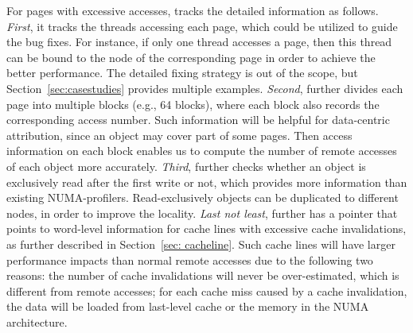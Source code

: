 For pages with excessive accesses, \NP{} tracks the detailed information as follows. \textit{First}, it tracks the threads accessing each page, which could be utilized to guide the bug fixes. For instance, if only one thread accesses a page, then this thread can be bound to the node of the corresponding page in order to achieve the better performance. The detailed fixing strategy is out of the scope, but Section~\ref{sec:casestudies} provides multiple examples. \textit{Second}, \NP{} further divides each page into multiple blocks (e.g., 64 blocks), where each block also records the corresponding access number. Such information will be helpful for data-centric attribution, since an object may cover part of some pages. Then access information on each block enables us to compute the number of remote accesses of each object more accurately. \textit{Third}, \NP{} further checks whether an object is exclusively read after the first write or not, which provides more information than existing NUMA-profilers. Read-exclusively objects can be duplicated to different nodes, in order to improve the locality. 
\textit{Last not least}, \NP{} further has a pointer that points to  word-level information for cache lines with excessive cache invalidations, as further described in Section~\ref{sec: cacheline}. Such cache lines will have larger performance impacts than normal remote accesses due to the following two reasons:  the number of cache invalidations will never be over-estimated, which is different from remote accesses; for each cache miss caused by a cache invalidation, the data will be loaded from last-level cache or the memory in the NUMA architecture. 



